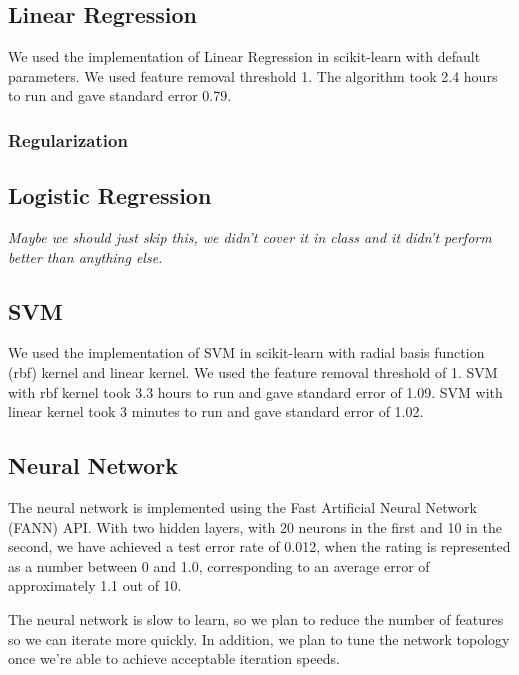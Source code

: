 \documentclass[journal]{IEEEtran}
\begin{document}
\subsection{Linear Regression}
We used the implementation of Linear Regression in scikit-learn with default
parameters. We used feature removal threshold 1. The algorithm took 2.4 hours
to run and gave standard error 0.79.

\subsubsection{Regularization}

\subsection{Logistic Regression}

\textit{Maybe we should just skip this, we didn't cover it in class and it didn't perform better than anything else.}

\subsection{SVM}
We used the implementation of SVM in scikit-learn with radial basis function (rbf) kernel and linear kernel. We used the feature removal threshold of 1. SVM with rbf kernel took 3.3 hours to run and gave standard error of 1.09. SVM with linear kernel took 3 minutes to run and gave standard error of 1.02.

\subsection{Neural Network}
The neural network is implemented using the Fast Artificial Neural Network (FANN)
API.  With two hidden layers, with 20 neurons in the first and 10 in the second, 
we have achieved a test error rate of 0.012, when the rating is represented as a
number between 0 and 1.0, corresponding to an average error of approximately 1.1 out of 10.  

The neural network is slow to learn, so we plan to reduce the number of features so we can
iterate more quickly.  In addition, we plan to tune the network topology once we're able
to achieve acceptable iteration speeds.
\end{document}
